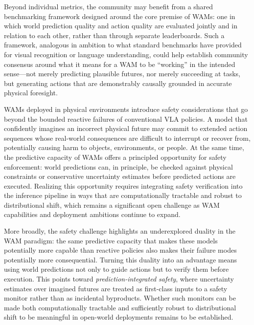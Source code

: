 Beyond individual metrics, the community may benefit from a shared benchmarking framework designed around the core premise of WAMs: one in which world prediction quality and action quality are evaluated jointly and in relation to each other, rather than through separate leaderboards. Such a framework, analogous in ambition to what standard benchmarks have provided for visual recognition or language understanding, could help establish community consensus around what it means for a WAM to be ``working'' in the intended sense—not merely predicting plausible futures, nor merely succeeding at tasks, but generating actions that are demonstrably causally grounded in accurate physical foresight.


 WAMs deployed in physical environments introduce safety considerations that go beyond the bounded reactive failures of conventional VLA policies. A model that confidently imagines an incorrect physical future may commit to extended action sequences whose real-world consequences are difficult to interrupt or recover from, potentially causing harm to objects, environments, or people. At the same time, the predictive capacity of WAMs offers a principled opportunity for safety enforcement: world predictions can, in principle, be checked against physical constraints or conservative uncertainty estimates before predicted actions are executed. Realizing this opportunity requires integrating safety verification into the inference pipeline in ways that are computationally tractable and robust to distributional shift, which remains a significant open challenge as WAM capabilities and deployment ambitions continue to expand.


More broadly, the safety challenge highlights an underexplored duality in the WAM paradigm: the same predictive capacity that makes these models potentially more capable than reactive policies also makes their failure modes potentially more consequential. Turning this duality into an advantage means using world predictions not only to guide actions but to verify them before execution. This points toward \textit{prediction-integrated safety}, where uncertainty estimates over imagined futures are treated as first-class inputs to a safety monitor rather than as incidental byproducts. Whether such monitors can be made both computationally tractable and sufficiently robust to distributional shift to be meaningful in open-world deployments remains to be established.



